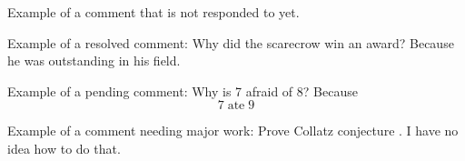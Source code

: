 \begin{rebuttal}
    {%
        Example of a comment that is not responded to yet.
    }%
    {%
    }%
\end{rebuttal}
\begin{rebuttal}[resolved]
    {%
        Example of a resolved comment: Why did the scarecrow win an award?
    }%
    {%
        Because he was outstanding in his field.
    }%
\end{rebuttal}
\begin{rebuttal}[pending]
    {%
        Example of a pending comment: Why is 7 afraid of 8?
    }%
    {%
        Because
        \begin{equation}
            7\;\textrm{ate}\;9
        \end{equation}
    }%
\end{rebuttal}
\begin{rebuttal}[stuck]
    {%
        Example of a comment needing major work: Prove Collatz conjecture \cite{collatz1937}.
    }%
    {%
        I have no idea how to do that.
    }%
\end{rebuttal}